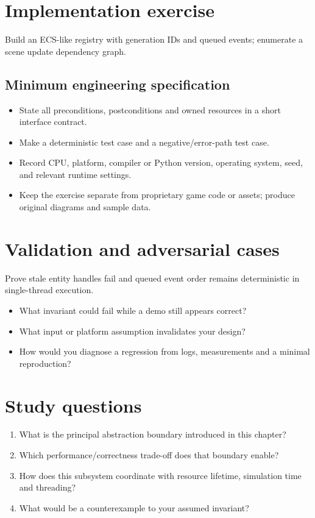 \documentclass[11pt,letterpaper]{article}
\begin{document}
\section{Implementation exercise}
Build an ECS-like registry with generation IDs and queued events; enumerate a scene update dependency graph.

\subsection{Minimum engineering specification}
\begin{itemize}
\item State all preconditions, postconditions and owned resources in a short interface contract.
\item Make a deterministic test case and a negative/error-path test case.
\item Record CPU, platform, compiler or Python version, operating system, seed, and relevant runtime settings.
\item Keep the exercise separate from proprietary game code or assets; produce original diagrams and sample data.
\end{itemize}
\section{Validation and adversarial cases}
Prove stale entity handles fail and queued event order remains deterministic in single-thread execution.

\begin{itemize}
\item What invariant could fail while a demo still appears correct?
\item What input or platform assumption invalidates your design?
\item How would you diagnose a regression from logs, measurements and a minimal reproduction?
\end{itemize}
\section{Study questions}
\begin{enumerate}
\item What is the principal abstraction boundary introduced in this chapter?
\item Which performance/correctness trade-off does that boundary enable?
\item How does this subsystem coordinate with resource lifetime, simulation time and threading?
\item What would be a counterexample to your assumed invariant?
\end{enumerate}
\end{document}
